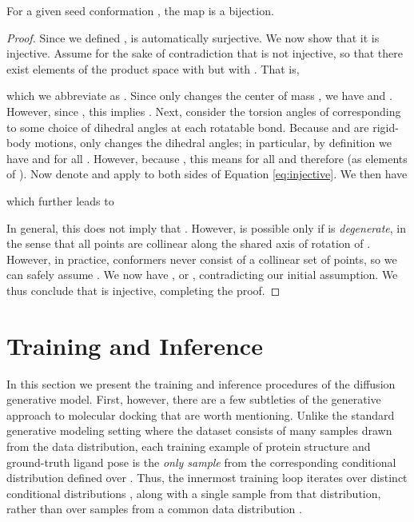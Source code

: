 \documentclass{article} \usepackage{iclr2023_conference,times}
\begin{document}
\begin{prop}
    For a given seed conformation , the map  is a bijection.
\end{prop}
\begin{proof}
    Since we defined ,  is automatically surjective. We now show that it is injective. Assume for the sake of contradiction that  is not injective, so that there exist elements of the product space  with  but with . That is,
    
    which we abbreviate as . Since only  changes the center of mass , we have  and . However, since , this implies . Next, consider the torsion angles  of  corresponding to some choice of dihedral angles at each rotatable bond. Because  and  are rigid-body motions, only  changes the dihedral angles; in particular, by definition we have  and  for all . However, because , this means  for all  and therefore  (as elements of ). Now denote  and apply  to both sides of Equation \ref{eq:injective}. We then have
    
    which further leads to
    
    In general, this does not imply that . However,  is possible only if  is \emph{degenerate}, in the sense that all points are collinear along the shared axis of rotation of . However, in practice, conformers never consist of a collinear set of points, so we can safely assume . We now have , or , contradicting our initial assumption. We thus conclude that  is injective, completing the proof.
\end{proof}


\section{Training and Inference} \label{app:train_inf}

In this section we present the training and inference procedures of the diffusion generative model. First, however, there are a few subtleties of the generative approach to molecular docking that are worth mentioning. Unlike the standard generative modeling setting where the dataset consists of many samples drawn from the data distribution, each training example  of protein structure  and ground-truth ligand pose  is the \emph{only sample} from the corresponding conditional distribution  defined over . Thus, the innermost training loop iterates over distinct conditional distributions , along with a single sample from that distribution, rather than over samples from a common data distribution .
\end{document}
